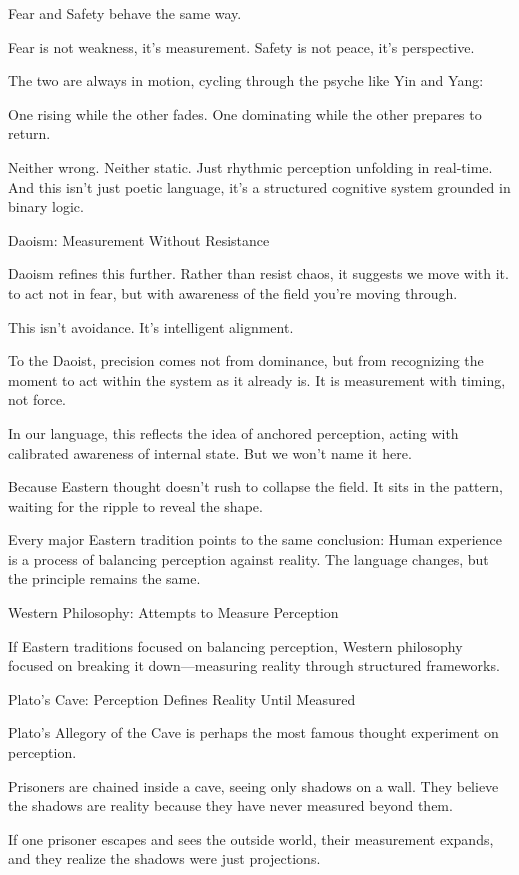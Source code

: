 \documentclass[12pt]{article}
\begin{document}
Fear and Safety behave the same way.

Fear is not weakness, it’s measurement.
Safety is not peace, it’s perspective.

The two are always in motion, cycling through the psyche like Yin and Yang:

One rising while the other fades.
One dominating while the other prepares to return.

Neither wrong. Neither static. Just rhythmic perception unfolding in real-time.
And this isn’t just poetic language, it’s a structured cognitive system grounded in binary logic.

Daoism: Measurement Without Resistance

Daoism refines this further.
Rather than resist chaos, it suggests we move with it.
to act not in fear, but with awareness of the field you're moving through.

This isn’t avoidance. It’s intelligent alignment.

To the Daoist, precision comes not from dominance, but from recognizing the moment to act within the system as it already is. It is measurement with timing, not force.

In our language, this reflects the idea of anchored perception, acting with calibrated awareness of internal state. But we won’t name it here.

Because Eastern thought doesn’t rush to collapse the field.
It sits in the pattern, waiting for the ripple to reveal the shape.

Every major Eastern tradition points to the same conclusion:
Human experience is a process of balancing perception against reality.
The language changes, but the principle remains the same.

Western Philosophy: Attempts to Measure Perception

If Eastern traditions focused on balancing perception, Western philosophy focused on breaking it down—measuring reality through structured frameworks.

Plato’s Cave: Perception Defines Reality Until Measured

Plato’s Allegory of the Cave is perhaps the most famous thought experiment on perception.

Prisoners are chained inside a cave, seeing only shadows on a wall.
They believe the shadows are reality because they have never measured beyond them.

If one prisoner escapes and sees the outside world, their measurement expands, and they realize the shadows were just projections.
\end{document}

